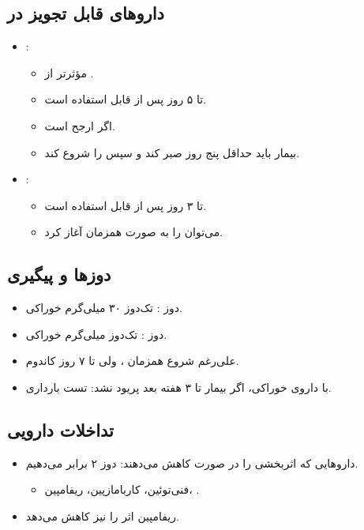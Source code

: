 \documentclass[12pt,a4paper]{article}
\begin{document}
\subsection*{داروهای قابل تجویز در }
\begin{itemize}
  \item {}:
  \begin{itemize}
    \item مؤثرتر از .
    \item تا ۵ روز پس از  قابل استفاده است.
    \item اگر  ارجح است.
    \item بیمار باید حداقل پنج روز صبر کند و سپس  را شروع کند.
  \end{itemize}
  \item {}:
  \begin{itemize}
    \item تا ۳ روز پس از  قابل استفاده است.
    \item می‌توان  را به صورت همزمان آغاز کرد.
  \end{itemize}
\end{itemize}

\subsection*{دوزها و پیگیری}
\begin{itemize}
  \item دوز : تک‌دوز ۳۰ میلی‌گرم خوراکی.
  \item دوز : تک‌دوز  میلی‌گرم خوراکی.
  \item علی‌رغم شروع همزمان ، ولی تا ۷ روز کاندوم.
  \item با داروی خوراکی، اگر بیمار تا ۳ هفته بعد پریود نشد: تست بارداری.
\end{itemize}

\subsection*{تداخلات دارویی}
\begin{itemize}
  \item داروهایی که اثربخشی  را در صورت  کاهش می‌دهند: دوز ۲ برابر  می‌دهیم.
  \begin{itemize}
    \item فنی‌توئین، کاربامازپین، ریفامپین، .
  \end{itemize}
  \item ریفامپین اثر  را نیز کاهش می‌دهد.
\end{itemize}
\end{document}
